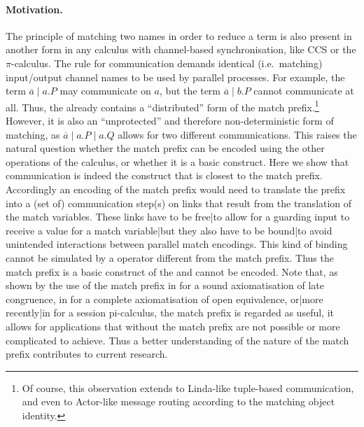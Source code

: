 \documentclass[]{article}
\begin{document}
\paragraph{Motivation.} The principle of matching two names in order to reduce a term is also present in another form in any calculus with channel-based synchronisation, like CCS or the $\pi$-calculus.
The rule for communication demands identical (i.e.~matching) input/output channel names to be used by parallel processes. For example, the term $ \overline{a} \mid a.P $ may communicate on $ a $, but the term $ \overline{a} \mid b.P $ cannot communicate at all. Thus, the \piCal already contains a ``distributed'' form of the match prefix.\footnote{Of course, this observation extends to Linda-like tuple-based communication, and even to Actor-like message routing according to the matching object identity.} However, it is also an ``unprotected'' and therefore non-deterministic form of matching, as $ \overline{a} \mid a.P \mid a.Q $ allows for two different communications. This raises the natural question whether the match prefix can be encoded using the other operations of the calculus, or whether it is a basic construct.
Here we show that communication is indeed the \piCal construct that is closest to the match prefix.
Accordingly an encoding of the match prefix would need to translate the prefix into a (set of) communication step(s) on links that result from the translation of the match variables. These links have to be free|to allow for a guarding input to receive a value for a match variable|but they also have to be bound|to avoid unintended interactions between parallel match encodings. This kind of binding cannot be simulated by a \piCal operator different from the match prefix.
Thus the match prefix is a basic construct of the \piCal and cannot be encoded.
Note that, as shown by the use of the match prefix \eg in \cite{milnerParrowWalker92} for a sound axiomatisation of late congruence, in \cite{sangiorgi96} for a complete axiomatisation of open equivalence, {or}|{more recently}|{in} \cite{giunti13} for a session pi-calculus, the match prefix is regarded as useful, \ie it allows for applications that without the match prefix are not possible or more complicated to achieve.
Thus a better understanding of the nature of the match prefix contributes to current research.
\end{document}
